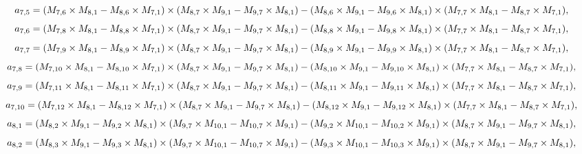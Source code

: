 \documentclass[10pt]{asme2ej}
\begin{document}
\begin{landscape}
\begin{equation}
    a_{7,5} = (M_{7,6}\times M_{8,1}-M_{8,6}\times M_{7,1})\times (M_{8,7}\times M_{9,1}-M_{9,7}\times M_{8,1})\\-(M_{8,6}\times M_{9,1}-M_{9,6}\times M_{8,1})\times (M_{7,7}\times M_{8,1}-M_{8,7}\times M_{7,1}),
\end{equation}
\begin{equation}
    a_{7,6} = (M_{7,8}\times M_{8,1}-M_{8,8}\times M_{7,1})\times (M_{8,7}\times M_{9,1}-M_{9,7}\times M_{8,1})\\-(M_{8,8}\times M_{9,1}-M_{9,8}\times M_{8,1})\times (M_{7,7}\times M_{8,1}-M_{8,7}\times M_{7,1}),
\end{equation}
\begin{equation}
    a_{7,7} = (M_{7,9}\times M_{8,1}-M_{8,9}\times M_{7,1})\times (M_{8,7}\times M_{9,1}-M_{9,7}\times M_{8,1})\\-(M_{8,9}\times M_{9,1}-M_{9,9}\times M_{8,1})\times (M_{7,7}\times M_{8,1}-M_{8,7}\times M_{7,1}),
\end{equation}
\begin{equation}
    a_{7,8} = (M_{7,10}\times M_{8,1}-M_{8,10}\times M_{7,1})\times (M_{8,7}\times M_{9,1}-M_{9,7}\times M_{8,1})\\-(M_{8,10}\times M_{9,1}-M_{9,10}\times M_{8,1})\times (M_{7,7}\times M_{8,1}-M_{8,7}\times M_{7,1}),
\end{equation}
\begin{equation}
    a_{7,9} = (M_{7,11}\times M_{8,1}-M_{8,11}\times M_{7,1})\times (M_{8,7}\times M_{9,1}-M_{9,7}\times M_{8,1})\\-(M_{8,11}\times M_{9,1}-M_{9,11}\times M_{8,1})\times (M_{7,7}\times M_{8,1}-M_{8,7}\times M_{7,1}),
\end{equation}
\begin{equation}
    a_{7,10} = (M_{7,12}\times M_{8,1}-M_{8,12}\times M_{7,1})\times (M_{8,7}\times M_{9,1}-M_{9,7}\times M_{8,1})\\-(M_{8,12}\times M_{9,1}-M_{9,12}\times M_{8,1})\times (M_{7,7}\times M_{8,1}-M_{8,7}\times M_{7,1}),
\end{equation}
\begin{equation}
    a_{8,1} = (M_{8,2}\times M_{9,1}-M_{9,2}\times M_{8,1})\times (M_{9,7}\times M_{10,1}-M_{10,7}\times M_{9,1})\\-(M_{9,2}\times M_{10,1}-M_{10,2}\times M_{9,1})\times (M_{8,7}\times M_{9,1}-M_{9,7}\times M_{8,1}),
\end{equation}
\begin{equation}
    a_{8,2} = (M_{8,3}\times M_{9,1}-M_{9,3}\times M_{8,1})\times (M_{9,7}\times M_{10,1}-M_{10,7}\times M_{9,1})\\-(M_{9,3}\times M_{10,1}-M_{10,3}\times M_{9,1})\times (M_{8,7}\times M_{9,1}-M_{9,7}\times M_{8,1}),

\end{equation}
\end{landscape}
\end{document}
